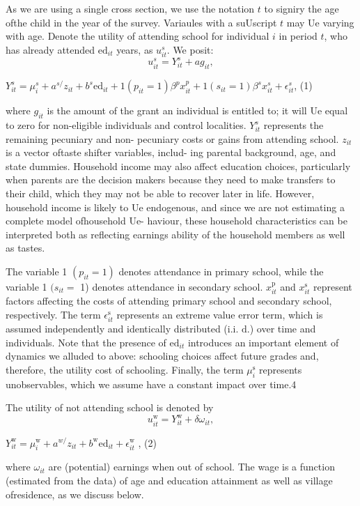 As we are using a single cross section, we use the notation $t$ to signiry the age ofthe child in the year of the survey. Variaules with a suUscript $t$ may Ue varying with age. Denote the utility of attending school for individual $i$ in period $t$, who has already attended $\mathrm{e}\mathrm{d}_{it}$ years, as $u_{it}^{s}$. We posit:
$$
u_{it}^{s}=Y_{it}^{s}+ag_{it},
$$
\begin{center}
$Y_{it}^{s}=\mu_{i}^{s}+a^{s/}z_{it}+b^{s}\mathrm{e}\mathrm{d}_{it}+1(p_{it}=1)\beta^{p}x_{it}^{p}+1(s_{it}=1)\beta^{s}x_{it}^{s}+\epsilon_{it}^{s}$,   (1)
\end{center}
where $g_{it}$ is the amount of the grant an individual is entitled to; it will Ue equal to zero for non-eligible individuals and control localities. $Y_{it}^{s}$ represents the remaining pecuniary and non- pecuniary costs or gains from attending school. $z_{it}$ is a vector oftaste shifter variables, includ- ing parental background, age, and state dummies. Household income may also affect education choices, particularly when parents are the decision makers because they need to make transfers to their child, which they may not be able to recover later in life. However, household income is likely to Ue endogenous, and since we are not estimating a complete model ofhousehold Ue- haviour, these household characteristics can be interpreted both as reflecting earnings ability of the household members as well as tastes.

The variable 1 $(p_{it}=1)$ denotes attendance in primary school, while the variable 1 $(s_{it}=$ 1) denotes attendance in secondary school. $x_{it}^{\mathrm{p}}$ and $x_{it}^{\mathrm{s}}$ represent factors affecting the costs of attending primary school and secondary school, respectively. The term $\epsilon_{it}^{\mathrm{s}}$ represents an extreme value error term, which is assumed independently and identically distributed (i.i. $\mathrm{d}.$) over time and individuals. Note that the presence of $\mathrm{e}\mathrm{d}_{it}$ introduces an important element of dynamics we alluded to above: schooling choices affect future grades and, therefore, the utility cost of schooling. Finally, the term $\mu_{i}^{\mathrm{s}}$ represents unobservables, which we assume have a constant impact over time.4

The utility of not attending school is denoted by
$$
u_{it}^{\mathrm{w}}=Y_{it}^{\mathrm{w}}+\delta\omega_{it},
$$
\begin{center}
$Y_{it}^{\mathrm{w}}=\mu_{i}^{\mathrm{w}}+a^{w/}z_{it}+b^{\mathrm{w}}\mathrm{e}\mathrm{d}_{it}+\epsilon_{it}^{\mathrm{w}}$ ,   (2)
\end{center}
where $\omega_{it}$ are (potential) earnings when out of school. The wage is a function (estimated from the data) of age and education attainment as well as village ofresidence, as we discuss below.

